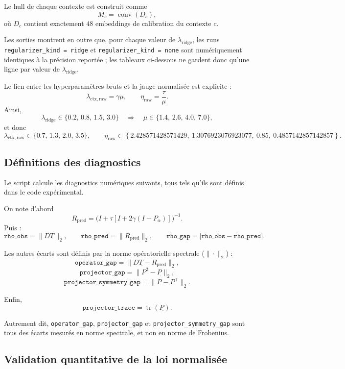 Le hull de chaque contexte est construit comme
\[
M_c = \operatorname{conv}(D_c),
\]
où \(D_c\) contient exactement \(48\) embeddings de calibration du contexte \(c\).

Les sorties montrent en outre que, pour chaque valeur de \(\lambda_{\mathrm{ridge}}\), les runs \texttt{regularizer\_kind = ridge} et \texttt{regularizer\_kind = none} sont numériquement identiques à la précision reportée ; les tableaux ci-dessous ne gardent donc qu’une ligne par valeur de \(\lambda_{\mathrm{ridge}}\).

Le lien entre les hyperparamètres bruts et la jauge normalisée est explicite :
\[
\lambda_{\mathrm{ctx,raw}}=\gamma \mu,\qquad
\eta_{\mathrm{raw}}=\frac{\tau}{\mu}.
\]
Ainsi,
\[
\lambda_{\mathrm{ridge}}\in\{0.2,\,0.8,\,1.5,\,3.0\}
\quad\Longrightarrow\quad
\mu\in\{1.4,\,2.6,\,4.0,\,7.0\},
\]
et donc
\[
\lambda_{\mathrm{ctx,raw}}\in\{0.7,\,1.3,\,2.0,\,3.5\},
\qquad
\eta_{\mathrm{raw}}\in\left\{2.428571428571429,\ 1.3076923076923077,\ 0.85,\ 0.4857142857142857\right\}.
\]



\subsection{Définitions des diagnostics}

Le script calcule les diagnostics numériques suivants, tous tels qu’ils sont définis dans le code expérimental.

On note d’abord
\[
R_{\mathrm{pred}} = \bigl(I+\tau[I+2\gamma(I-P_\alpha)]\bigr)^{-1}.
\]
Puis :
\[
\texttt{rho\_obs}=\|DT_{\hat{}}\|_2,\qquad
\texttt{rho\_pred}=\|R_{\mathrm{pred}}\|_2,
\qquad
\texttt{rho\_gap}=|\texttt{rho\_obs}-\texttt{rho\_pred}|.
\]

Les autres écarts sont définis par la norme opératorielle spectrale (\(\|\cdot\|_2\)) :
\[
\texttt{operator\_gap}=\|DT_{\hat{}}-R_{\mathrm{pred}}\|_2,
\]
\[
\texttt{projector\_gap}=\|P_{\hat{}}^2-P_{\hat{}}\|_2,
\]
\[
\texttt{projector\_symmetry\_gap}=\|P_{\hat{}}-P_{\hat{}}^\top\|_2.
\]

Enfin,
\[
\texttt{projector\_trace}=\operatorname{tr}(P_{\hat{}}).
\]

Autrement dit, \texttt{operator\_gap}, \texttt{projector\_gap} et \texttt{projector\_symmetry\_gap} sont tous des écarts mesurés en norme spectrale, et non en norme de Frobenius.

\subsection{Validation quantitative de la loi normalisée}

